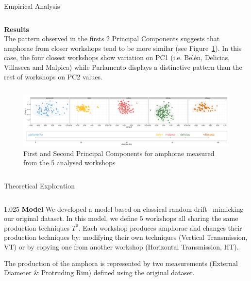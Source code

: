 \documentclass[final]{beamer}
\newlength{\onecolwid}
\newlength{\twocolwid}
\begin{document}
\begin{frame}[t]
\begin{columns}[t]
\begin{column}{\twocolwid}
\begin{block}{Empirical Analysis}
\begin{columns}[t,totalwidth=\twocolwid]
\begin{column}{\onecolwid} %

{\textbf{Results}}\\
\justify
The pattern observed in the firsts 2 Principal Components suggests that amphorae from closer workshops tend to be more similar (see Figure~\ref{fig:pca}). In this case, the four closest workshops show variation on PC1 (i.e. Bel\'en, Delicias, Villaseca and Malpica) while Parlamento displays a distinctive pattern than the rest of workshops on PC2 values.


\end{column}
\end{columns}

\begin{columns}[t,totalwidth=\twocolwid]


\begin{column}{\twocolwid} %
\begin{figure}
\includegraphics[width=0.6\linewidth]{images/fig2.pdf}
\singlespace
\caption{First and Second Principal Components for amphorae measured from the 5 analysed workshops}
\label{fig:pca}
\end{figure}
\end{column}
\end{columns}
\end{block}
\vspace{-1cm}
\begin{block}{Theoretical Exploration}

\begin{columns}[t,totalwidth=\twocolwid]

\begin{column}{1.025\onecolwid} %
{\textbf{Model}}
\justify
We developed a model based on classical random drift~\cite{bentley2004randomdriftandculturechange} mimicking our original dataset. In this model, we define $5$ workshops all sharing the same production techniques $T^{0}$. 
Each workshop produces amphorae and changes their production techniques by: modifying their own techniques (Vertical Transmission, VT) or by copying one from another workshop (Horizontal Transmission, HT). 

The production of the amphora is represented by two measurements (External Diameter \& Protruding Rim) defined using the original dataset.



\end{column}
\end{columns}
\end{block}
\end{column}
\end{columns}
\end{frame}
\end{document}
